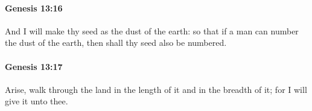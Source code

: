 		\paragraph{Genesis 13:16} %
			\label{GENESIS-13-16}

			And I will make thy seed as the dust of the earth: so that if a man can number the dust of the earth, then shall thy seed also be numbered.


		\paragraph{Genesis 13:17} %
			\label{GENESIS-13-17}

			Arise, walk through the land in the length of it and in the breadth of it; for I will give it unto thee.


